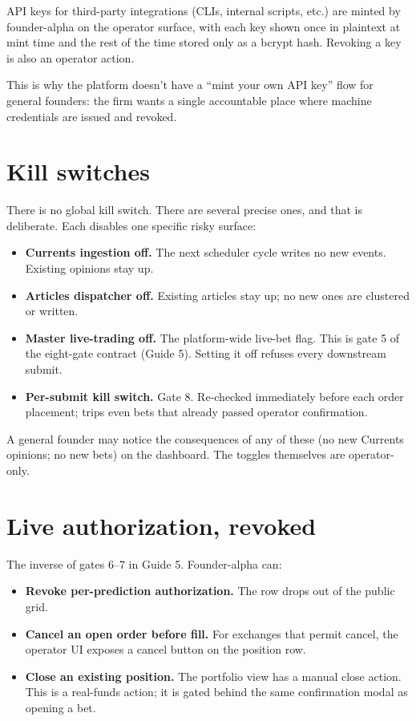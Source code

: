 \documentclass[11pt]{article}
\begin{document}
API keys for third-party integrations (CLIs, internal scripts, etc.)
are minted by founder-alpha on the operator surface, with each key
shown once in plaintext at mint time and the rest of the time stored
only as a bcrypt hash. Revoking a key is also an operator action.

This is why the platform doesn't have a ``mint your own API key''
flow for general founders: the firm wants a single accountable place
where machine credentials are issued and revoked.

\section{Kill switches}

There is no global kill switch. There are several precise ones, and
that is deliberate. Each disables one specific risky surface:

\begin{itemize}[leftmargin=*,itemsep=0.3em]
  \item \textbf{Currents ingestion off.} The next scheduler cycle
        writes no new events. Existing opinions stay up.
  \item \textbf{Articles dispatcher off.} Existing articles stay up;
        no new ones are clustered or written.
  \item \textbf{Master live-trading off.} The platform-wide live-bet
        flag. This is gate 5 of the eight-gate contract (Guide 5).
        Setting it off refuses every downstream submit.
  \item \textbf{Per-submit kill switch.} Gate 8. Re-checked
        immediately before each order placement; trips even bets that
        already passed operator confirmation.
\end{itemize}

A general founder may notice the consequences of any of these (no
new Currents opinions; no new bets) on the dashboard. The toggles
themselves are operator-only.

\section{Live authorization, revoked}

The inverse of gates 6--7 in Guide 5. Founder-alpha can:

\begin{itemize}[leftmargin=*,itemsep=0.2em]
  \item \textbf{Revoke per-prediction authorization.} The row drops
        out of the public grid.
  \item \textbf{Cancel an open order before fill.} For exchanges that
        permit cancel, the operator UI exposes a cancel button on
        the position row.
  \item \textbf{Close an existing position.} The portfolio view has a
        manual close action. This is a real-funds action; it is gated
        behind the same confirmation modal as opening a bet.
\end{itemize}
\end{document}
